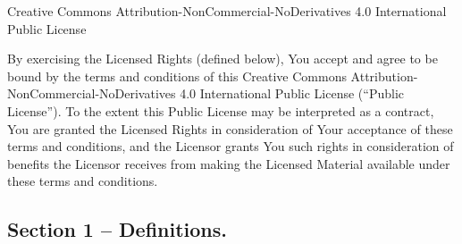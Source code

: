 \begin{center}\Large
Creative Commons Attribution-NonCommercial-NoDerivatives 4.0 International Public License
\end{center}


By exercising the Licensed Rights (defined below), You accept and agree to be bound by the terms and conditions of this Creative Commons Attribution-NonCommercial-NoDerivatives 4.0 International Public License (``Public License''). To the extent this Public License may be interpreted as a contract, You are granted the Licensed Rights in consideration of Your acceptance of these terms and conditions, and the Licensor grants You such rights in consideration of benefits the Licensor receives from making the Licensed Material available under these terms and conditions.

\subsection*{Section 1 – Definitions.}

